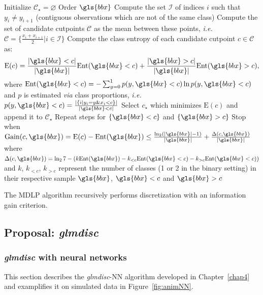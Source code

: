 \begin{algorithm}[H]
 Initialize $\mathcal{C}_\star = \varnothing$\;
Order $\gls{bbx}$\;
Compute the set $\mathcal{I}$ of indices $i$ such that $y_i \neq y_{i+1}$ (contiguous observations which are not of the same class)\;
Compute the set of candidate cutpoints $\mathcal{C}$ as the mean between these points, \textit{i.e.}\ $\mathcal{C} = \{\frac{x_i + x_{i+1}}{2} | i \in \mathcal{I} \}$\;
Compute the class entropy of each candidate cutpoint $c \in \mathcal{C}$ as:
\[ \text{E}(c) = \frac{|\gls{bbx} < c|}{|\gls{bbx}|} \text{Ent}(\gls{bbx} < c) + \frac{|\gls{bbx} > c|}{|\gls{bbx}|} \text{Ent}(\gls{bbx} > c), \]
where $\text{Ent}(\gls{bbx} < c) = - \sum_{y=0}^1 p(y,\gls{bbx} < c) \ln p(y,\gls{bbx} < c)$ and $p$ is estimated \textit{via} class proportions, \textit{i.e.}\ $p(y,\gls{bbx} < c) = \frac{|\{i | y_i = y \& x_i < c \}|}{|\gls{bbx} < c|}$\;
Select $c_\star$ which minimizes $\text{E}(c)$ and append it to $\mathcal{C}_\star$\;
Repeat steps for $\{\gls{bbx}< c\}$ and $\{\gls{bbx} > c\}$\;
Stop when $\text{Gain}(c,\gls{bbx}) = \text{E}(c) - \text{Ent}(\gls{bbx}) \leq \frac{\ln_2 (|\gls{bbx}|-1)}{|\gls{bbx}|} + \frac{\Delta(c,\gls{bbx}) }{|\gls{bbx}|}$ where $\Delta(c,\gls{bbx}) = \ln_2 7 - (k \text{Ent}(\gls{bbx}) - k_{<c}\text{Ent}(\gls{bbx} < c) - k_{>c}\text{Ent}(\gls{bbx} < c))$ and $k$, $k_{<c}$, $k_{>c}$ represent the number of classes (1 or 2 in the binary setting) in their respective sample $\gls{bbx}$, $\gls{bbx} < c$ and $\gls{bbx} > c$\;
 \caption{\label{mdlp} The MDLP algorithm recursively performs discretization with an information gain criterion.}
\end{algorithm}


\subsection{Proposal: \textit{glmdisc}}


\subsubsection{\textit{glmdisc} with neural networks} \label{app1:glmdiscNN}

This section describes the \textit{glmdisc}-NN algorithm developed in Chapter~\ref{chap4} and examplifies it on simulated data in Figure~\ref{fig:animNN}.

